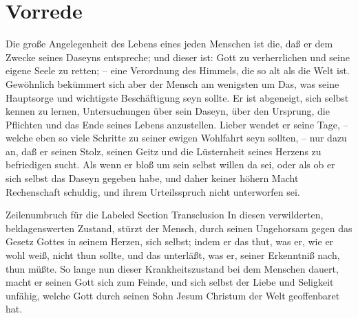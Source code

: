 \chapter{Vorrede}

Die große Angelegenheit des Lebens eines jeden Menschen ist die, daß er dem Zwecke seines Daseyns entspreche; und dieser ist: Gott zu verherrlichen und seine eigene Seele zu retten; – eine Verordnung des Himmels, die so alt als die Welt ist. Gewöhnlich bekümmert sich aber der Mensch am wenigsten um Das, was seine Hauptsorge und wichtigste Beschäftigung seyn sollte. Er ist abgeneigt, sich selbst kennen zu lernen, Untersuchungen über sein Daseyn, über den Ursprung, die Pflichten und das Ende seines Lebens anzustellen. Lieber wendet er seine Tage, – welche eben so viele Schritte zu seiner ewigen Wohlfahrt seyn sollten, – nur dazu an, daß er seinen Stolz, seinen Geitz und die Lüsternheit seines Herzens zu befriedigen sucht. Als wenn er bloß um sein selbst willen da sei, oder als ob er sich selbst das Daseyn gegeben habe, und daher keiner höhern Macht Rechenschaft schuldig, und ihrem Urteilsspruch nicht unterworfen sei.

Zeilenumbruch für die Labeled Section Transclusion In diesen verwilderten, beklagenswerten Zustand, stürzt der Mensch, durch seinen Ungehorsam gegen das Gesetz Gottes in seinem Herzen, sich selbst; indem er das thut, was er, wie er wohl weiß, nicht thun sollte, und das unterläßt, was er, seiner Erkenntniß nach, thun müßte. So lange nun dieser Krankheitszustand bei dem Menschen dauert, macht er seinen Gott sich zum Feinde, und sich selbst der Liebe und Seligkeit unfähig, welche Gott durch seinen Sohn Jesum Christum der Welt geoffenbaret hat.

